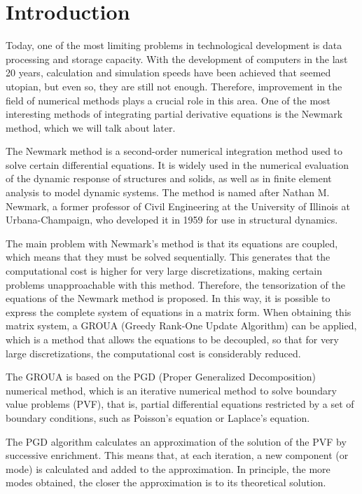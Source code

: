 \section{Introduction}



Today, one of the most limiting problems in technological development is data processing and storage capacity. With the development of computers in the last 20 years, calculation and simulation speeds have been achieved that seemed utopian, but even so, they are still not enough. Therefore, improvement in the field of numerical methods plays a crucial role in this area. One of the most interesting methods of integrating partial derivative equations is the Newmark method, which we will talk about later.


The Newmark method is a second-order numerical integration method used to solve certain differential equations. It is widely used in the numerical evaluation of the dynamic response of structures and solids, as well as in finite element analysis to model dynamic systems. The method is named after Nathan M. Newmark, a former professor of Civil Engineering at the University of Illinois at Urbana-Champaign, who developed it in 1959 for use in structural dynamics.

The main problem with Newmark's method is that its equations are coupled, which means that they must be solved sequentially. This generates that the computational cost is higher for very large discretizations, making certain problems unapproachable with this method. Therefore, the tensorization of the equations of the Newmark method is proposed. In this way, it is possible to express the complete system of equations in a matrix form. When obtaining this matrix system, a GROUA (Greedy Rank-One Update Algorithm) can be applied, which is a method that allows the equations to be decoupled, so that for very large discretizations, the computational cost is considerably reduced. 


The GROUA is based on the PGD (Proper Generalized Decomposition) numerical method, which is an iterative numerical method to solve boundary value problems (PVF), that is, partial differential equations restricted by a set of boundary conditions, such as Poisson's equation or Laplace's equation.

The PGD algorithm calculates an approximation of the solution of the PVF by successive enrichment. This means that, at each iteration, a new component (or mode) is calculated and added to the approximation. In principle, the more modes obtained, the closer the approximation is to its theoretical solution.

